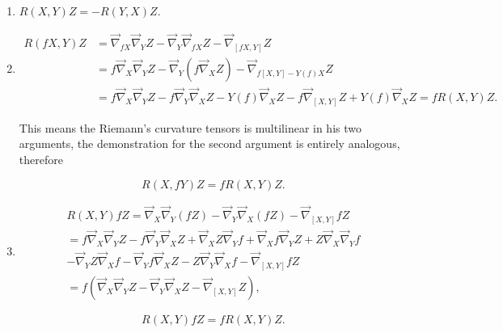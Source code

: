            \begin{enumerate}
                \item $R(X,Y)Z = - R(Y,X)Z$.

                \item 
                \begin{align}
                    R(fX,Y)Z &= \Vec{\nabla}_{fX}\Vec{\nabla}_YZ - \Vec{\nabla}_Y\Vec{\nabla}_{fX}Z - \Vec{\nabla}_{[fX,Y]}Z\\
                    &= f\Vec{\nabla}_X\Vec{\nabla}_YZ-\Vec{\nabla}_Y\left(f\Vec{\nabla}_XZ\right) - \Vec{\nabla}_{f[X,Y]-Y(f)X}Z\\
                    &= f\Vec{\nabla}_X\Vec{\nabla}_YZ-f\Vec{\nabla}_Y\Vec{\nabla}_XZ - Y(f)\Vec{\nabla}_XZ - f\Vec{\nabla}_{[X,Y]}Z + Y(f)\Vec{\nabla}_XZ = fR(X,Y)Z. 
                \end{align}

                This means the Riemann's curvature tensors is multilinear in his two arguments, the demonstration for the second argument is entirely analogous, therefore

                \begin{equation}
                    R(X,fY)Z = fR(X,Y)Z.
                \end{equation}

                \item  \begin{align*}
                    R(X,Y)fZ = \Vec{\nabla}_X\Vec{\nabla}_Y(fZ) - \Vec{\nabla}_Y\Vec{\nabla}_X(fZ) - \Vec{\nabla}_{[X,Y]}fZ\\
                    = f\Vec{\nabla}_X\Vec{\nabla}_YZ - f\Vec{\nabla}_Y\Vec{\nabla}_XZ + \Vec{\nabla}_XZ\Vec{\nabla}_Yf + \Vec{\nabla}_Xf\Vec{\nabla}_YZ + Z\Vec{\nabla}_X\Vec{\nabla}_Yf\\
                    - \Vec{\nabla}_YZ\Vec{\nabla}_Xf - \Vec{\nabla}_Yf\Vec{\nabla}_XZ - Z\Vec{\nabla}_Y\Vec{\nabla}_Xf - \Vec{\nabla}_{[X,Y]}fZ\\
                    = f\left(\Vec{\nabla}_X\Vec{\nabla}_YZ - \Vec{\nabla}_Y\Vec{\nabla}_XZ - \Vec{\nabla}_{[X,Y]}Z\right),
                \end{align*}

                \begin{equation}
                    R(X,Y)fZ = fR(X,Y)Z.
                \end{equation}
            \end{enumerate}

